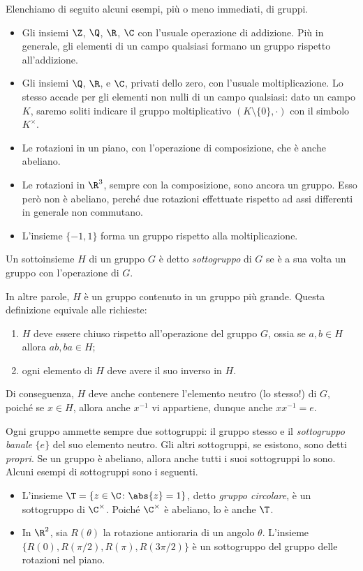 Elenchiamo di seguito alcuni esempi, più o meno immediati, di gruppi.
\begin{itemize}
	\item Gli insiemi $\Z$, $\Q$, $\R$, $\C$ con l'usuale operazione di addizione. Più in generale, gli elementi di un campo qualsiasi formano un gruppo rispetto all'addizione.
	\item Gli insiemi $\Q$, $\R$, e $\C$, privati dello zero, con l'usuale moltiplicazione. Lo stesso accade per gli elementi non nulli di un campo qualsiasi: dato un campo $K$, saremo soliti indicare il gruppo moltiplicativo $(K\setminus\{0\},\cdot)$ con il simbolo $K^\times$.
	\item Le rotazioni in un piano, con l'operazione di composizione, che è anche abeliano.
	\item Le rotazioni in $\R^3$, sempre con la composizione, sono ancora un gruppo. Esso però non è abeliano, perch\'e due rotazioni effettuate rispetto ad assi differenti in generale non commutano.
	\item L'insieme $\{-1,1\}$ forma un gruppo rispetto alla moltiplicazione.
\end{itemize}

\begin{definizione} \label{d:sottogruppo}
	Un sottoinsieme $H$ di un gruppo $G$ è detto \emph{sottogruppo} di $G$ se è a sua volta un gruppo con l'operazione di $G$.
\end{definizione}
In altre parole, $H$ è un gruppo contenuto in un gruppo più grande.
Questa definizione equivale alle richieste:
\begin{enumerate}
	\item $H$ deve essere chiuso rispetto all'operazione del gruppo $G$, ossia se $a,b\in H$ allora $ab,ba\in H$;
	\item ogni elemento di $H$ deve avere il suo inverso in $H$.
\end{enumerate}
Di conseguenza, $H$ deve anche contenere l'elemento neutro (lo stesso!) di $G$, poich\'e se $x\in H$, allora anche $x^{-1}$ vi appartiene, dunque anche $xx^{-1}=e$.

Ogni gruppo ammette sempre due sottogruppi: il gruppo stesso e il \emph{sottogruppo banale} $\{e\}$ del suo elemento neutro.
Gli altri sottogruppi, se esistono, sono detti \emph{propri}.
Se un gruppo è abeliano, allora anche tutti i suoi sottogruppi lo sono.
Alcuni esempi di sottogruppi sono i seguenti.
\begin{itemize}
	\item L'insieme $\T=\{z\in\C\colon \abs{z}=1\}$, detto \emph{gruppo circolare}, è un sottogruppo di $\C^\times$.
		Poich\'e $\C^\times$ è abeliano, lo è anche $\T$.
	\item In $\R^2$, sia $R(\theta)$ la rotazione antioraria di un angolo $\theta$.
		L'insieme $\{R(0), R(\pi/2), R(\pi), R(3\pi/2)\}$ è un sottogruppo del gruppo delle rotazioni nel piano.
\end{itemize}

